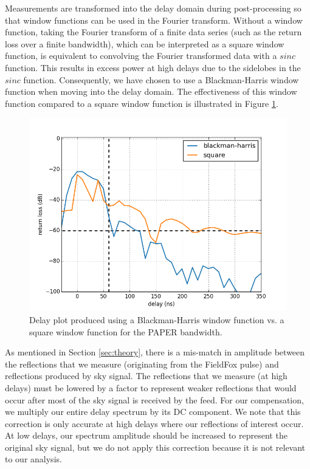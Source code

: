 \documentclass[12pt,preprint]{aastex}
\begin{document}
Measurements are transformed into the delay domain during post-processing so that window functions
can be used in the Fourier transform. Without a window function, taking the Fourier transform of a finite data series (such as the return loss over a finite bandwidth), which can be interpreted as a square window function, is equivalent to convolving the Fourier transformed data with a $sinc$ function. This results in excess power at high delays due to the sidelobes in the $sinc$ function. Consequently, we have chosen to use a Blackman-Harris window function when moving into the delay domain. The effectiveness of this window function compared to a square window function is illustrated in Figure \ref{fig:window}.

\begin{figure}
\centering
\includegraphics[totalheight=0.4\textheight]{plots/bh_vs_sq.png}
\caption{Delay plot produced using a Blackman-Harris window function vs. a square window function for the PAPER bandwidth.}
\label{fig:window}
\end{figure}

As mentioned in Section \ref{sec:theory}, there is a mis-match in amplitude between the reflections that we measure (originating from the FieldFox pulse) and reflections produced by sky signal. The reflections that we measure (at high delays) must be lowered by a factor to represent weaker reflections that would occur after most of the sky signal is received by the feed. For our compensation, we multiply our entire delay spectrum by its DC component. We note that this correction is only accurate at high delays where our reflections of interest occur. At low delays, our spectrum amplitude should be increased to represent the original sky signal, but we do not apply this correction because it is not relevant to our analysis.
\end{document}
